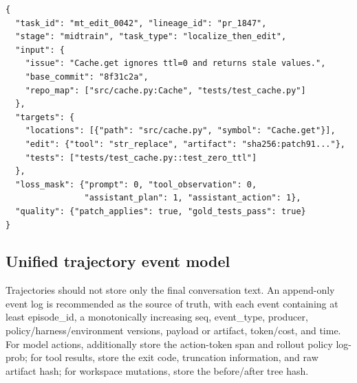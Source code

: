 \documentclass[10pt,a4paper,UTF8,fontset=none]{ctexart}
\newcommand{\ident}[1]{{\rmfamily #1}}
\begin{document}
\begin{lstlisting}[style=codeblock,caption={Mid-training atomic task derived from a PR/Issue},label={en:lst:midtrain-sample}]
{
  "task_id": "mt_edit_0042", "lineage_id": "pr_1847",
  "stage": "midtrain", "task_type": "localize_then_edit",
  "input": {
    "issue": "Cache.get ignores ttl=0 and returns stale values.",
    "base_commit": "8f31c2a",
    "repo_map": ["src/cache.py:Cache", "tests/test_cache.py"]
  },
  "targets": {
    "locations": [{"path": "src/cache.py", "symbol": "Cache.get"}],
    "edit": {"tool": "str_replace", "artifact": "sha256:patch91..."},
    "tests": ["tests/test_cache.py::test_zero_ttl"]
  },
  "loss_mask": {"prompt": 0, "tool_observation": 0,
                "assistant_plan": 1, "assistant_action": 1},
  "quality": {"patch_applies": true, "gold_tests_pass": true}
}
\end{lstlisting}

\subsection{Unified trajectory event model}

Trajectories should not store only the final conversation text. An append-only event log is recommended as the source of truth, with each event containing at least \ident{episode\_id}, a monotonically increasing \ident{seq}, \ident{event\_type}, producer, policy/harness/environment versions, payload or artifact, token/cost, and time. For model actions, additionally store the action-token span and rollout policy log-prob; for tool results, store the exit code, truncation information, and raw artifact hash; for workspace mutations, store the before/after tree hash.
\end{document}
